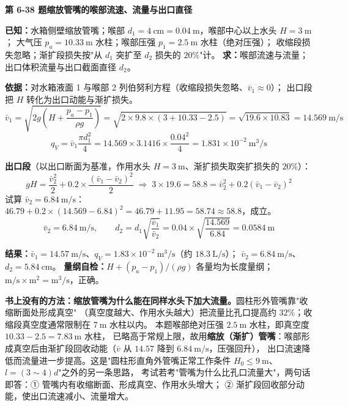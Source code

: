 \noindent\textbf{第 6-38 题\quad 缩放管嘴的喉部流速、流量与出口直径}

\begin{jie}
\textbf{已知：}水箱侧壁缩放管嘴；喉部 $d_1=4\ \mathrm{cm}=0.04\ \mathrm{m}$，喉部中心以上水头 $H=3\ \mathrm{m}$；
大气压 $p_a=10.33\ \mathrm{m}$ 水柱；喉部压强 $p_1=2.5\ \mathrm{m}$ 水柱（绝对压强）；
收缩段损失忽略；渐扩段损失按"从 $d_1$ 突扩至 $d_2$ 损失的 $20\%$"计。
\textbf{求：}喉部流速与流量；出口体积流量与出口截面直径 $d_2$。

\textbf{依据：}对水箱液面 1 与喉部 2 列伯努利方程（收缩段损失忽略、$\bar v_1\approx0$）；
出口段把 $H$ 转化为出口动能与渐扩损失。
\[ \bar v_1=\sqrt{2g\left(H+\frac{p_a-p_1}{\rho g}\right)}
=\sqrt{2\times9.8\times(3+10.33-2.5)}=\sqrt{19.6\times10.83}=14.569\ \mathrm{m/s} \]
\[ q_V=\bar v_1\frac{\pi d_1^2}{4}=14.569\times3.1416\times\frac{0.04^2}{4}=1.831\times10^{-2}\ \mathrm{m^3/s} \]

\textbf{出口段}（以出口断面为基准，作用水头 $H=3\ \mathrm{m}$、渐扩损失取突扩损失的 $20\%$）：
\[ gH=\frac{\bar v_2^2}{2}+0.2\times\frac{(\bar v_1-\bar v_2)^2}{2}
\;\Longrightarrow\;3\times19.6=58.8=\bar v_2^2+0.2(\bar v_1-\bar v_2)^2 \]
试算 $\bar v_2=6.84\ \mathrm{m/s}$：$46.79+0.2\times(14.569-6.84)^2=46.79+11.95=58.74\approx58.8$，成立。
\[ \bar v_2=6.84\ \mathrm{m/s},\qquad
d_2=d_1\sqrt{\frac{\bar v_1}{\bar v_2}}=0.04\times\sqrt{\frac{14.569}{6.84}}=0.0584\ \mathrm{m} \]

\textbf{结果：}$\bar v_1=14.57\ \mathrm{m/s}$、$q_V=1.83\times10^{-2}\ \mathrm{m^3/s}$（约 $18.3\ \mathrm{L/s}$）；
$\bar v_2=6.84\ \mathrm{m/s}$、$d_2=5.84\ \mathrm{cm}$。
\textbf{量纲自检：}$H+(p_a-p_1)/(\rho g)$ 各量均为长度量纲；$\mathrm{m/s\times m^2}=\mathrm{m^3/s}$，正确。
\end{jie}

\begin{tishi}
\textbf{书上没有的方法：缩放管嘴为什么能在同样水头下加大流量。}圆柱形外管嘴靠"收缩断面处形成真空"
（真空度越大、作用水头越大）把流量比孔口提高约 $32\%$；收缩段真空度通常限制在 $7\ \mathrm{m}$ 水柱以内。
本题喉部绝对压强 $2.5\ \mathrm{m}$ 水柱，即真空度 $10.33-2.5=7.83\ \mathrm{m}$ 水柱，
已略高于常规上限，故用\textbf{缩放（渐扩）管嘴}：喉部形成真空后由渐扩段回收动能（$\bar v$ 从 $14.57$ 降到 $6.84\ \mathrm{m/s}$，压强回升），
出口流速降低而流量进一步提高。这是"圆柱形直角外管嘴正常工作条件 $H_0\le9\ \mathrm{m}$、$l=(3\sim4)d$"之外的另一条思路，
考试若考"管嘴为什么比孔口流量大"，两句话即答：① 管嘴内有收缩断面、形成真空、作用水头增大；
② 渐扩段回收部分动能，使出口流速减小、流量增大。
\end{tishi}

